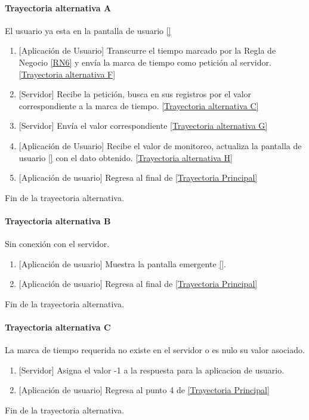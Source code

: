 \paragraph{Trayectoria alternativa A} \label{SUB-M-CU5:TA}
	El usuario ya esta en la pantalla de usuario \ref{} 
	\begin{enumerate}[label=A\arabic*.]
		\item {[Aplicación de Usuario]} Transcurre el tiempo marcado por la Regla de Negocio \ref{RN6} y envía la marca de tiempo como petición al servidor. \hyperref[SUB-M-CU5:TF]{[Trayectoria alternativa F]} 
		\item {[Servidor]} Recibe la petición, busca en sus registros por el valor correspondiente a la marca de tiempo. \hyperref[SUB-M-CU5:TC]{[Trayectoria alternativa C]} 
		\item  {[Servidor]} Envía el valor correspondiente \hyperref[SUB-M-CU5:TG]{[Trayectoria alternativa G]}
        \item {[Aplicación de Usuario]} Recibe el valor de monitoreo, actualiza la pantalla de usuario \ref{} con el dato obtenido.
        \hyperref[SUB-M-CU5:TH]{[Trayectoria alternativa H]}
        \item {[Aplicación de usuario]} Regresa al final de \hyperref[SUB-M-CU5:TP]{[Trayectoria Principal]}
	\end{enumerate}
	Fin de la trayectoria alternativa.

\paragraph{Trayectoria alternativa B} \label{SUB-M-CU5:TB}
	Sin conexión con el servidor.
	\begin{enumerate}[label=B\arabic*.]
		\item {[Aplicación de usuario]} Muestra la pantalla emergente \ref{}.
		\item {[Aplicación de usuario]} Regresa al final de \hyperref[SUB-M-CU5:TP]{[Trayectoria Principal]}
	\end{enumerate}
	Fin de la trayectoria alternativa.

\paragraph{Trayectoria alternativa C} \label{SUB-M-CU5:TC}
	La marca de tiempo requerida no existe en el servidor o es nulo su valor asociado.
	\begin{enumerate}[label=C\arabic*.]
		\item {[Servidor]} Asigna el valor -1 a la respuesta para la aplicacion de usuario.
		\item {[Aplicación de usuario]} Regresa al punto 4 de \hyperref[SUB-M-CU5:TP]{[Trayectoria Principal]}
	\end{enumerate}
	Fin de la trayectoria alternativa.

